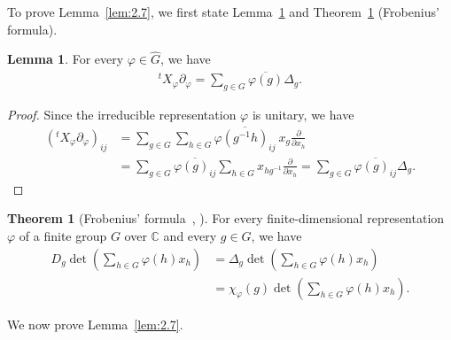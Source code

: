 \documentclass[12pt,a4paper]{article}
\theoremstyle{definition}
\newtheorem{thm}[definition]{Theorem}
\newtheorem{lem}[definition]{Lemma}
\numberwithin{definition}{section}
\begin{document}
To prove Lemma~\ref{lem:2.7}, we first state
Lemma~\ref{lem:2.9} and Theorem~\ref{thm:2.10} (Frobenius' formula).

\begin{lem}\label{lem:2.9}
For every $\varphi\in\widehat G$, we have
\begin{align*}
{}^t X_{\varphi} \partial_{\varphi}
=
\sum_{g \in G} \overline{\varphi(g)} \Delta_{g}.
\end{align*}
\end{lem}
\begin{proof}
Since the irreducible representation $\varphi$ is unitary, we have
\begin{align*}
({}^tX_\varphi\partial_\varphi)_{ij}
&=
\sum_{g \in G}
\sum_{h \in G}
\overline{\varphi(g^{-1} h)_{i j}} \ x_{g} \frac{\partial}{\partial x_{h}}\\
&=
\sum_{g \in G} \overline{\varphi(g)_{ij}}
\sum_{h \in G} x_{h g^{-1}} \frac{\partial}{\partial x_{h}}
=
\sum_{g \in G} \overline{\varphi(g)_{ij}} \Delta_{g}.
\end{align*}
\end{proof}

\begin{thm}[Frobenius' formula~{\cite[p.~50]{Frobenius1968gruppen}}, {\cite{Yamaguchi13022026}}]\label{thm:2.10}
For every finite-dimensional representation $\varphi$ of a finite group $G$
over $\mathbb C$ and every $g\in G$, we have
\[
\begin{aligned}
D_{g} \det{\left( \sum_{h \in G} \varphi(h) x_{h} \right)}
&= \Delta_{g} \det{\left( \sum_{h \in G} \varphi(h) x_{h} \right)}\\
&= \chi_{\varphi}(g) \det{\left( \sum_{h \in G} \varphi(h) x_{h} \right)}.
\end{aligned}
\]
\end{thm}

We now prove Lemma~\ref{lem:2.7}.
\end{document}
